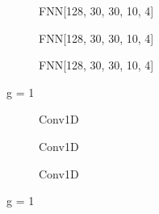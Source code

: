 \documentclass[a4paper,times,12pt]{article}
\begin{document}
\begin{figure}[H]
    \centering
    \begin{subfigure}[t]{0.45\textwidth}
		\centering
        
        \caption{FNN[128, 30, 30, 10, 4]}
		\label{fig:a}
    \end{subfigure}\hfill
    \begin{subfigure}[t]{0.45\textwidth}
		\centering
        
        \caption{FNN[128, 30, 30, 10, 4]}
		\label{fig:b}
    \end{subfigure}\hfill    
    \begin{subfigure}[t]{0.45\textwidth}
        \centering
        
        \caption{FNN[128, 30, 30, 10, 4]}
		\label{fig:c}
    \end{subfigure}
	\caption{g = 1}
\end{figure}


\begin{figure}[H]
    \centering
    \begin{subfigure}[t]{0.45\textwidth}
		\centering
        
        \caption{Conv1D}
		\label{fig:a}
    \end{subfigure}\hfill
    \begin{subfigure}[t]{0.45\textwidth}
		\centering
        
        \caption{Conv1D}
		\label{fig:b}
    \end{subfigure}\hfill    
    \begin{subfigure}[t]{0.45\textwidth}
        \centering
        
        \caption{Conv1D}
		\label{fig:c}
    \end{subfigure}
	\caption{g = 1}
\end{figure}
\end{document}
